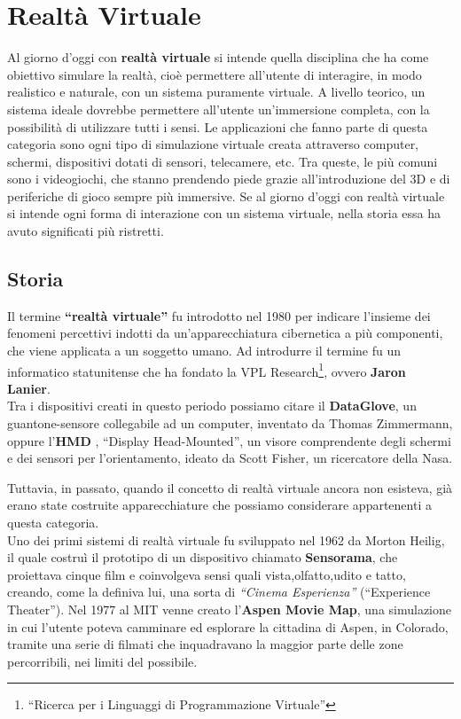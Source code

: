 
\chapter{Realtà Virtuale}

Al giorno d'oggi con \textbf{realtà virtuale} si intende quella disciplina che ha come obiettivo simulare la realtà, cioè permettere all'utente di interagire, in modo realistico e naturale, con un sistema puramente virtuale. A livello teorico, un sistema ideale dovrebbe permettere all'utente un'immersione completa, con la possibilità di utilizzare tutti i sensi. Le applicazioni che fanno parte di questa categoria sono ogni tipo di simulazione virtuale creata attraverso computer, schermi, dispositivi dotati di sensori, telecamere, etc. Tra queste, le più comuni sono i videogiochi, che stanno prendendo piede grazie all'introduzione del 3D e di periferiche di gioco sempre più immersive.
Se al giorno d'oggi con realtà virtuale si intende ogni forma di interazione con un sistema virtuale, nella storia essa ha avuto significati più ristretti.
 
\section{Storia} 
Il termine \textbf{“realtà virtuale”} fu introdotto nel 1980  per indicare l'insieme dei fenomeni percettivi indotti da un'apparecchiatura cibernetica a più componenti, che viene applicata a un soggetto umano\cite{realta2}.
Ad introdurre il termine fu un informatico statunitense che ha fondato la VPL Research\footnote{“Ricerca per i Linguaggi di Programmazione Virtuale”}, ovvero \textbf{Jaron Lanier}.\\
Tra i dispositivi creati in questo periodo possiamo citare  il \textbf{DataGlove}, un guantone-sensore collegabile ad un computer, inventato da Thomas Zimmermann, oppure l'\textbf{HMD} , “Display Head-Mounted”, un visore comprendente degli schermi e dei sensori per l'orientamento, ideato da  Scott Fisher, un ricercatore della Nasa.

Tuttavia, in passato, quando il concetto di realtà virtuale ancora non esisteva, già erano state costruite apparecchiature che possiamo considerare appartenenti a questa categoria.\\
Uno dei primi sistemi di realtà virtuale fu sviluppato nel 1962 da Morton Heilig, il quale costruì il prototipo di un dispositivo chiamato \textbf{Sensorama}, che proiettava cinque film e coinvolgeva sensi quali vista,olfatto,udito e tatto, creando, come la definiva lui, una sorta di \textit{“Cinema Esperienza”} (“Experience Theater”).
Nel 1977 al MIT venne creato l'\textbf{Aspen Movie Map}, una simulazione in cui l'utente poteva camminare ed esplorare la cittadina di Aspen, in Colorado, tramite una serie di filmati che inquadravano la maggior parte delle zone percorribili, nei limiti del possibile.


